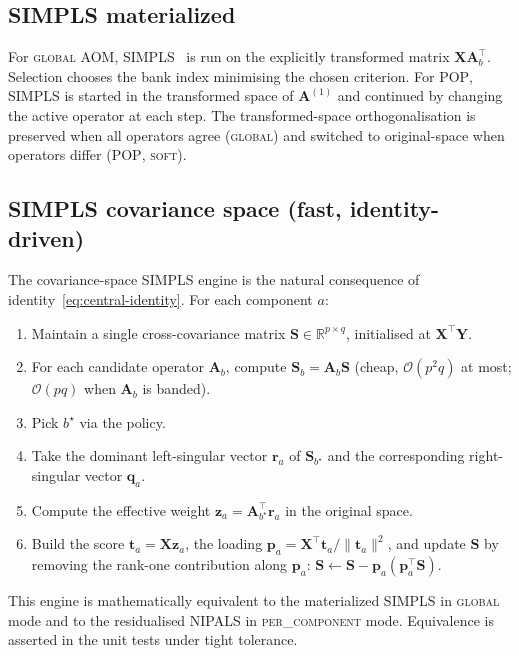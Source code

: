 \documentclass[review,a4paper]{elsarticle}
\newcommand{\R}{\mathbb{R}}
\newcommand{\Xmat}{\mathbf{X}}
\newcommand{\Ymat}{\mathbf{Y}}
\newcommand{\Amat}{\mathbf{A}}
\newcommand{\Smat}{\mathbf{S}}
\newcommand{\zvec}{\mathbf{z}}
\newcommand{\rvec}{\mathbf{r}}
\newcommand{\tvec}{\mathbf{t}}
\newcommand{\pvec}{\mathbf{p}}
\newcommand{\qvec}{\mathbf{q}}
\newcommand{\AOM}{\textsc{AOM}\xspace}
\newcommand{\POP}{\textsc{POP}\xspace}
\newcommand{\NIPALS}{\textsc{NIPALS}\xspace}
\newcommand{\SIMPLS}{\textsc{SIMPLS}\xspace}
\begin{document}
\subsection{SIMPLS materialized}
\label{sec:algo-simpls-mat}
For \textsc{global} \AOM, \SIMPLS\ \cite{dejong1993simpls} is run on
the explicitly transformed matrix $\Xmat\Amat_b^\top$. Selection
chooses the bank index minimising the chosen criterion. For \POP,
\SIMPLS is started in the transformed space of $\Amat^{(1)}$ and
continued by changing the active operator at each step. The
transformed-space orthogonalisation is preserved when all operators
agree (\textsc{global}) and switched to original-space when operators
differ (\POP, \textsc{soft}).

\subsection{SIMPLS covariance space (fast, identity-driven)}
\label{sec:algo-simpls-cov}
The covariance-space \SIMPLS engine is the natural consequence of
identity~\eqref{eq:central-identity}. For each component $a$:

\begin{enumerate}[leftmargin=2em]
  \item Maintain a single cross-covariance matrix $\Smat\in\R^{p\times
        q}$, initialised at $\Xmat^\top \Ymat$.
  \item For each candidate operator $\Amat_b$, compute
        $\Smat_b=\Amat_b \Smat$ (cheap, $\mathcal{O}(p^2 q)$ at most;
        $\mathcal{O}(pq)$ when $\Amat_b$ is banded).
  \item Pick $b^\star$ via the policy.
  \item Take the dominant left-singular vector $\rvec_a$ of
        $\Smat_{b^\star}$ and the corresponding right-singular
        vector $\qvec_a$.
  \item Compute the effective weight $\zvec_a=\Amat_{b^\star}^\top
        \rvec_a$ in the original space.
  \item Build the score $\tvec_a=\Xmat\zvec_a$, the loading
        $\pvec_a=\Xmat^\top\tvec_a/\|\tvec_a\|^2$, and update $\Smat$
        by removing the rank-one contribution along $\pvec_a$:
        $\Smat\leftarrow\Smat-\pvec_a(\pvec_a^\top\Smat)$.
\end{enumerate}
This engine is mathematically equivalent to the materialized \SIMPLS
in \textsc{global} mode and to the residualised \NIPALS in
\textsc{per\_component} mode. Equivalence is asserted in the unit
tests under tight tolerance.
\end{document}
